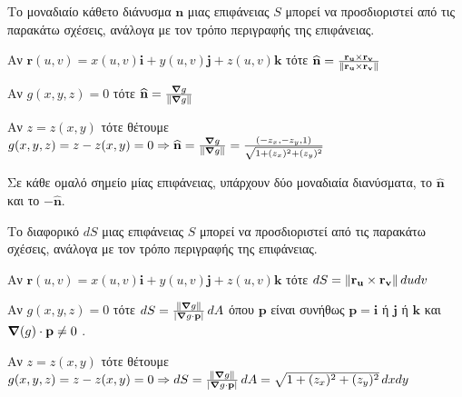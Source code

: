\begin{dfn}
  Το μοναδιαίο κάθετο διάνυσμα $ \mathbf{n} $ μιας επιφάνειας $ S $ μπορεί να 
  προσδιοριστεί από τις παρακάτω σχέσεις, ανάλογα με τον τρόπο περιγραφής της επιφάνειας.
  \begin{myitemize}
    \item Αν $ \mathbf{r}(u,v) = x(u,v)\mathbf{i}+y(u,v)\mathbf{j}+z(u,v)\mathbf{k} $ 
      τότε $ \mathbf{\widehat{n}} = \frac{\mathbf{r_{u}} \times
      \mathbf{r_{v}}}{\norm{\mathbf{r_{u}} \times \mathbf{r_{v}}}} $ 
    \item Αν $ g(x,y,z)=0 $ τότε $ \mathbf{\widehat{n}} = 
      \frac{\grad g}{\norm{\grad g}} $
    \item Αν $ z=z(x,y) $ τότε θέτουμε $ g(x,y,z)=z-z(x,y)=0 \Rightarrow 
      \mathbf{\widehat{n}} = \frac{\grad g}{\norm{\grad g}} = 
      \frac{(-z_{x},-z_{y},1)}{\sqrt{1+(z_{x})^{2}+(z_{y})^{2}}} $ 
  \end{myitemize}
\end{dfn}

\begin{rem}
  Σε κάθε ομαλό σημείο μίας επιφάνειας, υπάρχουν δύο μοναδιαία διανύσματα, το $
  \mathbf{\widehat{n}} $ και το $ -\mathbf{\widehat{n}} $.  
\end{rem}

\begin{dfn}
  Το διαφορικό $ dS $ μιας επιφάνειας $S$ μπορεί να προσδιοριστεί από τις παρακάτω 
  σχέσεις, ανάλογα με τον τρόπο περιγραφής της επιφάνειας.
  \begin{myitemize}
    \item Αν $ \mathbf{r}(u,v) = x(u,v)\mathbf{i}+y(u,v)\mathbf{j}+z(u,v)\mathbf{k} $ 
      τότε $ dS = \norm{\mathbf{r_{u}} \times \mathbf{r_{v}}} \, du dv $ 
    \item Αν $ g(x,y,z)=0 $ τότε $dS = \frac{\norm{\grad g}}{\abs{\grad g \cdot 
      \mathbf{p}}}\, dA $ όπου $ \mathbf{p} $ είναι συνήθως $ \mathbf{p} = \mathbf{i} $ 
      ή $ \mathbf{j} $ ή $ \mathbf{k} $ και $ \grad(g)\cdot \mathbf{p} \neq 0 $ .  
    \item Αν $ z=z(x,y) $ τότε θέτουμε $ g(x,y,z)=z-z(x,y)=0 \Rightarrow dS =
      \frac{\norm{\grad g}}{\abs{\grad g \cdot \mathbf{p}}}\, dA = 
      \sqrt{1+(z_{x})^{2}+(z_{y})^{2}} \,dxdy $ 
  \end{myitemize}
\end{dfn}

